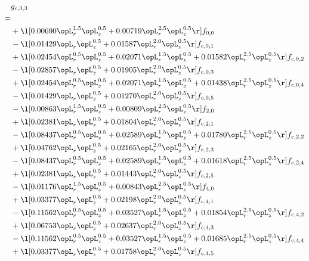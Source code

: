 \begin{alignat}{2} 
\label{eq:g_33_0} 
& g_{c,3,3} \nonumber \\ 
 = \\ 
& + \l[  0.00690 \opL_r^{1.5} \opL_z^{0.5} +  0.00719 \opL_r^{2.5} \opL_z^{0.5}  \r] f_{0,0} \nonumber \\ 
& - \l[  0.01429 \opL_r \opL_z^{0.5} +  0.01587 \opL_r^{2.0} \opL_z^{0.5}  \r] f_{c,0,1} \nonumber \\ 
& + \l[  0.02454 \opL_r^{0.5} \opL_z^{0.5} +  0.02071 \opL_r^{1.5} \opL_z^{0.5} +  0.01582 \opL_r^{2.5} \opL_z^{0.5}  \r] f_{c,0,2} \nonumber \\ 
& - \l[  0.02857 \opL_r \opL_z^{0.5} +  0.01905 \opL_r^{2.0} \opL_z^{0.5}  \r] f_{c,0,3} \nonumber \\ 
& + \l[  0.02454 \opL_r^{0.5} \opL_z^{0.5} +  0.02071 \opL_r^{1.5} \opL_z^{0.5} +  0.01438 \opL_r^{2.5} \opL_z^{0.5}  \r] f_{c,0,4} \nonumber \\ 
& - \l[  0.01429 \opL_r \opL_z^{0.5} +  0.01270 \opL_r^{2.0} \opL_z^{0.5}  \r] f_{c,0,5} \nonumber \\ 
& - \l[  0.00863 \opL_r^{1.5} \opL_z^{0.5} +  0.00809 \opL_r^{2.5} \opL_z^{0.5}  \r] f_{2,0} \nonumber \\ 
& + \l[  0.02381 \opL_r \opL_z^{0.5} +  0.01804 \opL_r^{2.0} \opL_z^{0.5}  \r] f_{c,2,1} \nonumber \\ 
& - \l[  0.08437 \opL_r^{0.5} \opL_z^{0.5} +  0.02589 \opL_r^{1.5} \opL_z^{0.5} +  0.01780 \opL_r^{2.5} \opL_z^{0.5}  \r] f_{c,2,2} \nonumber \\ 
& + \l[  0.04762 \opL_r \opL_z^{0.5} +  0.02165 \opL_r^{2.0} \opL_z^{0.5}  \r] f_{c,2,3} \nonumber \\ 
& - \l[  0.08437 \opL_r^{0.5} \opL_z^{0.5} +  0.02589 \opL_r^{1.5} \opL_z^{0.5} +  0.01618 \opL_r^{2.5} \opL_z^{0.5}  \r] f_{c,2,4} \nonumber \\ 
& + \l[  0.02381 \opL_r \opL_z^{0.5} +  0.01443 \opL_r^{2.0} \opL_z^{0.5}  \r] f_{c,2,5} \nonumber \\ 
& - \l[  0.01176 \opL_r^{1.5} \opL_z^{0.5} +  0.00843 \opL_r^{2.5} \opL_z^{0.5}  \r] f_{4,0} \nonumber \\ 
& + \l[  0.03377 \opL_r \opL_z^{0.5} +  0.02198 \opL_r^{2.0} \opL_z^{0.5}  \r] f_{c,4,1} \nonumber \\ 
& - \l[  0.11562 \opL_r^{0.5} \opL_z^{0.5} +  0.03527 \opL_r^{1.5} \opL_z^{0.5} +  0.01854 \opL_r^{2.5} \opL_z^{0.5}  \r] f_{c,4,2} \nonumber \\ 
& + \l[  0.06753 \opL_r \opL_z^{0.5} +  0.02637 \opL_r^{2.0} \opL_z^{0.5}  \r] f_{c,4,3} \nonumber \\ 
& - \l[  0.11562 \opL_r^{0.5} \opL_z^{0.5} +  0.03527 \opL_r^{1.5} \opL_z^{0.5} +  0.01685 \opL_r^{2.5} \opL_z^{0.5}  \r] f_{c,4,4} \nonumber \\ 
& + \l[  0.03377 \opL_r \opL_z^{0.5} +  0.01758 \opL_r^{2.0} \opL_z^{0.5}  \r] f_{c,4,5} \nonumber \\ 
\end{alignat} 


